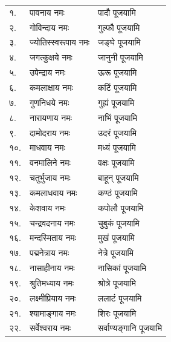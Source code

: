 \begin{longtable}{ll@{—}l}
१. & पावनाय नमः & पादौ पूजयामि\\
२. & गोविन्दाय नमः & गुल्फौ पूजयामि\\
३. & ज्योतिस्स्वरूपाय नमः & जङ्घे पूजयामि\\
४. & जगत्कुक्षये नमः & जानुनी पूजयामि\\
५. & उपेन्द्राय नमः & ऊरू पूजयामि\\
६. & कमलाक्षाय नमः & कटिं पूजयामि\\
७. & गुणनिधये नमः & गुह्यं पूजयामि\\
८. & नारायणाय नमः & नाभिं पूजयामि\\
९. & दामोदराय नमः & उदरं पूजयामि\\
१०. & माधवाय नमः & मध्यं पूजयामि\\
११. & वनमालिने नमः & वक्षः पूजयामि\\
१२. & चतुर्भुजाय नमः & बाहून् पूजयामि\\
१३. & कमलाधवाय नमः & कण्ठं पूजयामि\\
१४. & केशवाय नमः & कपोलौ पूजयामि\\
१५. & चन्द्रवदनाय नमः & चुबुकं पूजयामि\\
१६. & मन्दस्मिताय नमः & मुखं पूजयामि\\
१७. & पद्मनेत्राय नमः & नेत्रे पूजयामि\\
१८. & नासाहीनाय नमः & नासिकां पूजयामि\\
१९. & श्रुतिमध्याय नमः & श्रोत्रे पूजयामि\\
२०. & लक्ष्मीप्रियाय नमः & ललाटं पूजयामि\\
२१. & श्यामाङ्गाय नमः & शिरः पूजयामि\\
२२. & सर्वेश्वराय नमः & सर्वाण्यङ्गानि पूजयामि\\
\end{longtable}

